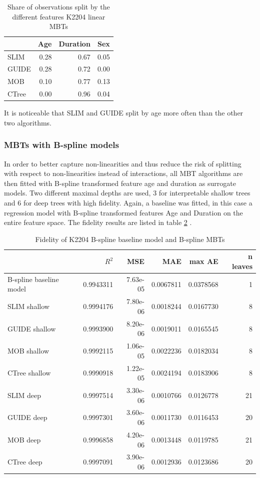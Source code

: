 \begin{table}[!htb]

\caption{Share of observations split by the different features K2204 linear MBTs}
\centering
\begin{tabular}[t]{l|r|r|r}
\hline
& Age & Duration & Sex\\
\hline
SLIM & 0.28 & 0.67 & 0.05\\
GUIDE & 0.28 & 0.72 & 0.00\\
MOB & 0.10 & 0.77 & 0.13\\
CTree & 0.00 & 0.96 & 0.04\\
\hline
\end{tabular}
\label{tab:ins_k2204_lm_surrogates_share}
\end{table}

It is noticeable that SLIM and GUIDE split by age more often than the other two algorithms.

\subsubsection{MBTs with B-spline models}

In order to better capture non-linearities and thus reduce the risk of splitting with respect to non-linearities instead of interactions, all MBT algorithms are then fitted with B-spline transformed feature age and duration as surrogate models. 
Two different maximal depths are used, 3 for interpretable shallow trees and 6 for deep trees with high fidelity.  Again, a baseline was fitted, in this case a regression model with B-spline transformed features Age and Duration on the entire feature space. The fidelity results are listed in table \ref{tab:ins_k2204_bsplines_surrogates_perf} .

\begin{table}

\caption{Fidelity of K2204 B-spline baseline model and  B-spline MBTs}
\centering
\begin{tabular}[t]{l|r|r|r|r|r}
\hline
  & $R^2$ & MSE & MAE & max AE & n leaves\\
\hline
B-spline baseline model & 0.9943311 & 7.63e-05 & 0.0067811 & 0.0378568 & 1\\
\hline
SLIM shallow & 0.9994176 & 7.80e-06 & 0.0018244 & 0.0167730 & 8\\
GUIDE shallow & 0.9993900 & 8.20e-06 & 0.0019011 & 0.0165545 & 8\\
MOB shallow & 0.9992115 & 1.06e-05 & 0.0022236 & 0.0182034 & 8\\
CTree shallow & 0.9990918 & 1.22e-05 & 0.0024194 & 0.0183906 & 8\\
\hline
SLIM deep & 0.9997514 & 3.30e-06 & 0.0010766 & 0.0126778 & 21\\
GUIDE deep & 0.9997301 & 3.60e-06 & 0.0011730 & 0.0116453 & 20\\
MOB deep & 0.9996858 & 4.20e-06 & 0.0013448 & 0.0119785 & 21\\
CTree deep & 0.9997091 & 3.90e-06 & 0.0012936 & 0.0123686 & 20\\
\hline
\end{tabular}
\label{tab:ins_k2204_bsplines_surrogates_perf}
\end{table}



